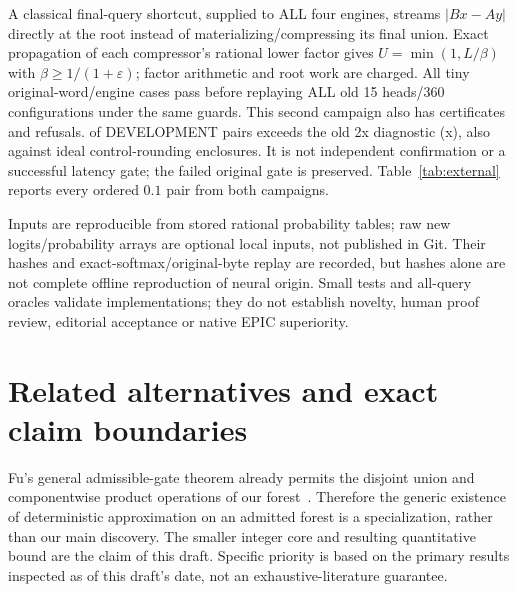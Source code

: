 \documentclass[11pt]{article}
\begin{document}
A classical final-query shortcut, supplied to ALL four engines, streams
$|Bx-Ay|$ directly at the root instead of materializing/compressing its final
union. Exact propagation of each compressor's rational lower factor gives
$U=\min(1,L/\beta)$ with $\beta\geq1/(1+\varepsilon)$; factor arithmetic and
root work are charged. All \RootOracleCases{} tiny original-word/engine cases pass before
replaying ALL old 15 heads/360 configurations under the same guards. This
second campaign also has \ExternalCertificates{} certificates and \ExternalRefusals{} refusals. \DevelopmentPassed{} of \DevelopmentPairs{}
DEVELOPMENT pairs exceeds the old 2x diagnostic (\BestDevelopmentRatio{}x), also against ideal
control-rounding enclosures. It is not independent confirmation or a successful
latency gate; the failed original gate is preserved. Table~\ref{tab:external}
reports every ordered $0.1$ pair from both campaigns.

\begin{table}[htbp]
\centering\scriptsize

\caption{All \DevelopmentPairs{} ordered $\varepsilon=0.1$ pairs per campaign: best cheap upper
 divided by candidate upper. `ref.' is an explicit resource refusal. V25
 is independent only for the four documents after the first; V26 reuses ALL
 old heads and is DEVELOPMENT. Values rounded for display; predicates use
 exact rational values. All360 records per campaign, including other methods
 and tolerances, remain in the immutable artifact. No semantic/speed gate.}
\label{tab:external}
\end{table}

Inputs are reproducible from stored rational probability tables; raw new
logits/probability arrays are optional local inputs, not published in Git.
Their hashes and exact-softmax/original-byte replay are recorded, but hashes
alone are not complete offline reproduction of neural origin. Small tests
and all-query oracles validate implementations; they do not establish novelty,
human proof review, editorial acceptance or native EPIC superiority.

\section{Related alternatives and exact claim boundaries}\label{sec:related}
Fu's general admissible-gate theorem already permits the disjoint union and
componentwise product operations of our forest~\cite{fu}. Therefore the
generic existence of deterministic approximation on an admitted forest is
a specialization, rather than our main discovery. The smaller integer core
and resulting quantitative bound are the claim of this draft. Specific
priority is based on the primary results inspected as of this draft's date,
not an exhaustive-literature guarantee.
\end{document}
